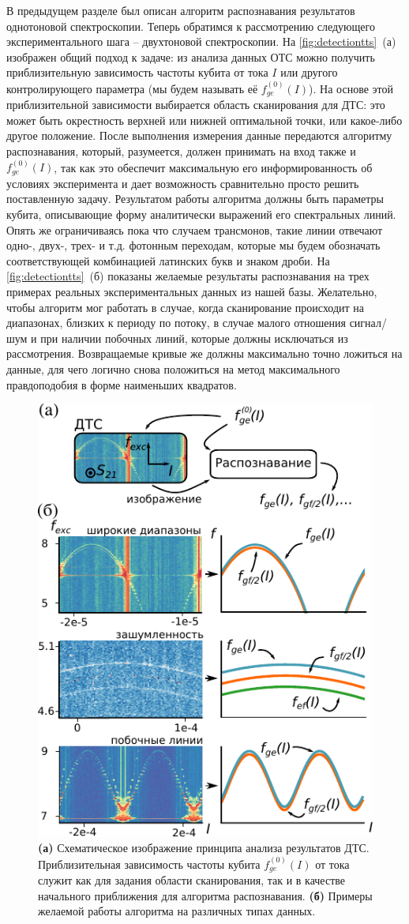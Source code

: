 \documentclass[14pt, a4paper]{extreport}
\numberwithin{equation}{section}
\begin{document}
	В предыдущем разделе был описан алгоритм распознавания результатов однотоновой спектроскопии. Теперь обратимся к рассмотрению следующего экспериментального шага -- двухтоновой спектроскопии. На \autoref{fig:detectiontts}~(а) изображен общий подход к задаче: из анализа данных ОТС можно получить приблизительную зависимость частоты кубита от тока $I$ или другого контролирующего параметра (мы будем называть её $f_{ge}^{(0)}(I)$). На основе этой приблизительной зависимости выбирается область сканирования для ДТС: это может быть окрестность верхней или нижней оптимальной точки, или какое-либо другое положение. После выполнения измерения данные передаются алгоритму распознавания, который, разумеется, должен принимать на вход также и $f_{ge}^{(0)}(I)$, так как это обеспечит максимальную его информированность об условиях эксперимента и дает возможность сравнительно просто решить поставленную задачу. Результатом работы алгоритма должны быть параметры кубита, описывающие форму аналитически выражений его спектральных линий. Опять же ограничиваясь пока что случаем трансмонов, такие линии отвечают одно-, двух-, трех- и т.д. фотонным переходам, которые мы будем обозначать соответствующей комбинацией латинских букв и знаком дроби. На \autoref{fig:detectiontts}~(б) показаны желаемые результаты распознавания на трех примерах реальных экспериментальных данных из нашей базы. Желательно, чтобы алгоритм мог работать в случае, когда сканирование происходит на диапазонах, близких к периоду по потоку, в случае малого отношения сигнал/шум и при наличии побочных линий, которые должны исключаться из рассмотрения. Возвращаемые кривые же должны максимально точно ложиться на данные, для чего логично снова положиться на метод максимального правдоподобия в форме наименьших квадратов. 
	
	
	\begin{figure}[t]
		\centering
		\includegraphics[width=0.6\linewidth]{Pictures/detection_tts}
		\caption{\textbf{(а)} Схематическое изображение принципа анализа результатов ДТС. Приблизительная зависимость частоты кубита $f_{ge}^{(0)}(I)$ от тока служит как для задания области сканирования, так и в качестве начального приближения для алгоритма распознавания. \textbf{(б)} Примеры желаемой работы алгоритма на различных типах данных.}
		\label{fig:detectiontts}
	\end{figure}
	
\end{document}
